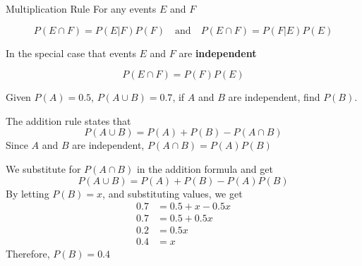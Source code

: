 \begin{summarybox}{Multiplication Rule}
    For any events \(E\) and \(F\)

    \[ P(E \cap F) = P(E | F)P(F) \quad \text{and} \quad P(E \cap F) = P(F| E)P(E) \]

    In the special case that events \(E\) and \(F\) are \textbf{independent}

    \[ P(E \cap F) = P(F)P(E) \]
\end{summarybox}

\begin{example}
    Given \( P(A) = 0.5 \), \( P(A \cup B) = 0.7 \), if \( A \) and \( B \) are independent, find \( P(B) \).
\end{example}

\begin{solution}
    The addition rule states that
    \[ P(A \cup B) = P(A) + P(B) - P(A \cap B) \]
    Since \( A \) and \( B \) are independent, \( P(A \cap B) = P(A)P(B) \)

    We substitute for \( P(A \cap B) \) in the addition formula and get
    \[ P(A \cup B) = P(A) + P(B) - P(A)P(B) \]
    By letting \( P(B) = x \), and substituting values, we get
    \begin{align*}
        0.7 & = 0.5 + x - 0.5x \\
        0.7 & = 0.5 + 0.5x     \\
        0.2 & = 0.5x           \\
        0.4 & = x
    \end{align*}
    Therefore, \( P(B) = 0.4 \)
\end{solution}